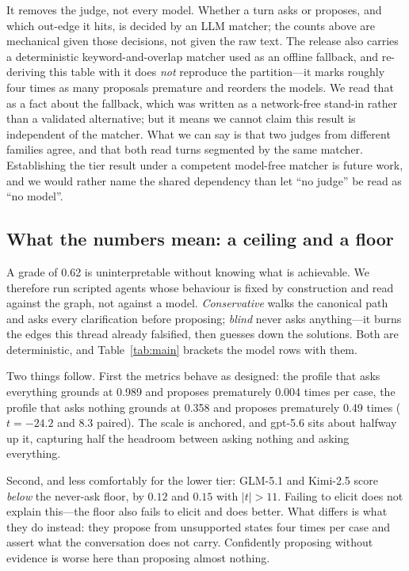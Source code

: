 \documentclass{article} %
\begin{document}
It removes the judge, not every model. Whether a turn asks or proposes,
and which out-edge it hits, is decided by an LLM matcher; the counts
above are mechanical given those decisions, not given the raw text. The
release also carries a deterministic keyword-and-overlap matcher used as
an offline fallback, and re-deriving this table with it does \emph{not}
reproduce the partition---it marks roughly four times as many proposals
premature and reorders the models. We read that as a fact about the
fallback, which was written as a network-free stand-in rather than a
validated alternative; but it means we cannot claim this result is
independent of the matcher. What we can say is that two judges from
different families agree, and that both read turns segmented by the same
matcher. Establishing the tier result under a competent model-free
matcher is future work, and we would rather name the shared dependency
than let ``no judge'' be read as ``no model''.

\subsection{What the numbers mean: a ceiling and a floor}
\label{sec:validity}

A grade of 0.62 is uninterpretable without knowing what is achievable. We
therefore run scripted agents whose behaviour is fixed by construction
and read against the graph, not against a model. \emph{Conservative}
walks the canonical path and asks every clarification before proposing;
\emph{blind} never asks anything---it burns the edges this thread already
falsified, then guesses down the solutions. Both are deterministic, and Table~\ref{tab:main} brackets the model rows
with them.

Two things follow. First the metrics behave as designed: the profile that
asks everything grounds at 0.989 and proposes prematurely 0.004 times per
case, the profile that asks nothing grounds at 0.358 and proposes
prematurely 0.49 times ($t = -24.2$ and $8.3$ paired). The scale is
anchored, and gpt-5.6 sits about halfway up it, capturing half the
headroom between asking nothing and asking everything.

Second, and less comfortably for the lower tier: GLM-5.1 and Kimi-2.5
score \emph{below} the never-ask floor, by $0.12$ and $0.15$ with
$|t| > 11$. Failing to elicit does not explain this---the floor also
fails to elicit and does better. What differs is what they do instead:
they propose from unsupported states four times per case and assert what
the conversation does not carry. Confidently proposing without evidence
is worse here than proposing almost nothing.
\end{document}
